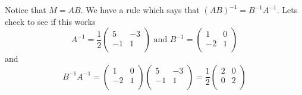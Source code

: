{Notice that $M = AB$. We have a rule which says that  $(AB)^{-1} = B^{-1}A^{-1}$. Lets check to see if this works
\[
A^{-1} =
\frac{1}{2}
\left( \begin{array}{cc}
5 & -3  \\
-1 & 1\\
\end{array} \right)
\text{ and }
B^{-1}=
\left( \begin{array}{cc}
1 & 0  \\
-2 & 1 \\
\end{array} \right)
\]
and 
\[
B^{-1}A^{-1}=
\left( \begin{array}{cc}
1 & 0  \\
-2 & 1 \\
\end{array} \right)
\left( \begin{array}{cc}
5 & -3  \\
-1 & 1\\
\end{array} \right)
= \frac{1}{2}
\left( \begin{array}{cc}
2 & 0  \\
0 & 2\\
\end{array} \right)
\]



} %

